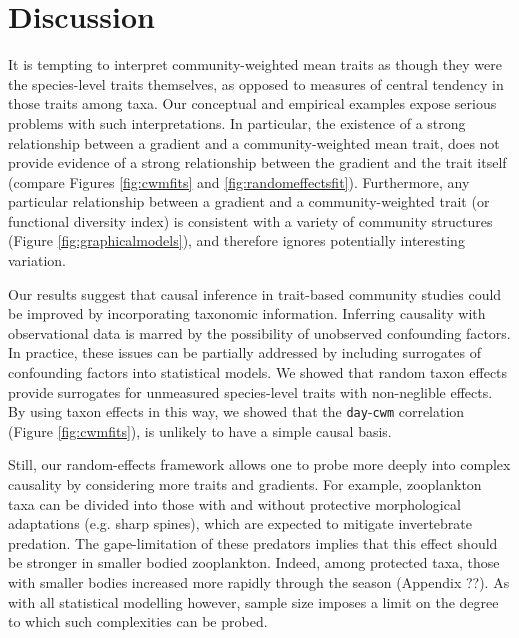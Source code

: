 \documentclass[12pt]{ecology}
\begin{document}
\section{Discussion}

It is tempting to interpret community-weighted mean traits as though they were the species-level traits themselves, as opposed to measures of central tendency in those traits among taxa.  Our conceptual and empirical examples expose serious problems with such interpretations.  In particular, the existence of a strong relationship between a gradient and a community-weighted mean trait, does not provide evidence of a strong relationship between the gradient and the trait itself (compare Figures \ref{fig:cwmfits} and \ref{fig:randomeffectsfit}).  Furthermore, any particular relationship between a gradient and a community-weighted trait (or functional diversity index) is consistent with a variety of community structures (Figure \ref{fig:graphicalmodels}), and therefore ignores potentially interesting variation.

Our results suggest that causal inference in trait-based community studies could be improved by incorporating taxonomic information.  Inferring causality with observational data is marred by the possibility of unobserved confounding factors.  In practice, these issues can be partially addressed by including surrogates of confounding factors into statistical models.  We showed that random taxon effects provide surrogates for unmeasured species-level traits with non-neglible effects.  By using taxon effects in this way, we showed that the \texttt{day}-\texttt{cwm} correlation (Figure \ref{fig:cwmfits}), is unlikely to have a simple causal basis.

Still, our random-effects framework allows one to probe more deeply into complex causality by considering more traits and gradients.  For example, zooplankton taxa can be divided into those with and without protective morphological adaptations (e.g. sharp spines), which are expected to mitigate invertebrate predation.  The gape-limitation of these predators implies that this effect should be stronger in smaller bodied zooplankton.  Indeed, among protected taxa, those with smaller bodies increased more rapidly through the season (Appendix ??).  As with all statistical modelling however, sample size imposes a limit on the degree to which such complexities can be probed.



\end{document}

